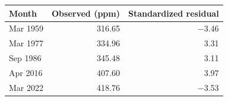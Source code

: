 \begin{tabular}{lrr}
\toprule
Month & Observed (ppm) & Standardized residual\\
\midrule
Mar 1959 & 316.65 & $-$3.46\\
Mar 1977 & 334.96 & 3.31\\
Sep 1986 & 345.48 & 3.11\\
Apr 2016 & 407.60 & 3.97\\
Mar 2022 & 418.76 & $-$3.53\\
\bottomrule
\end{tabular}
